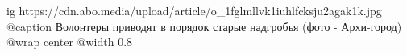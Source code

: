  
 
 
 
 

\ifcmt
  ig https://cdn.abo.media/upload/article/o_1fglmllvk1iuhlfcksju2agak1k.jpg
	@caption  Волонтеры приводят в порядок старые надгробья (фото - Архи-город) 
  @wrap center
  @width 0.8
\fi
